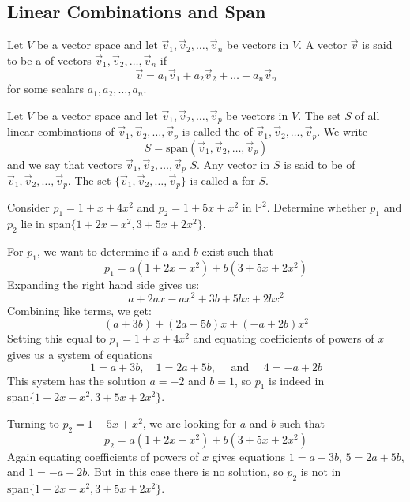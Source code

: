 \documentclass{ximera}
\begin{document}
\subsection*{Linear Combinations and Span}

\begin{definition}\label{def:lincombabstract}
Let $V$ be a vector space and let $\vec{v}_1, \vec{v}_2,\ldots ,\vec{v}_n$ be vectors in $V$.  A vector $\vec{v}$ is said to be a  of vectors $\vec{v}_1, \vec{v}_2,\ldots, \vec{v}_n$ if 
$$\vec{v}=a_1\vec{v}_1+ a_2\vec{v}_2+\ldots + a_n\vec{v}_n$$
for some scalars $a_1, a_2, \ldots ,a_n$.
\end{definition}

\begin{definition}\label{def:spanabstract} Let $V$ be a vector space and let $\vec{v}_1, \vec{v}_2,\ldots ,\vec{v}_p$ be vectors in $V$.  The set $S$ of all linear combinations of $\vec{v}_1, \vec{v}_2,\ldots ,\vec{v}_p$ is called the  of $\vec{v}_1, \vec{v}_2,\ldots ,\vec{v}_p$.  We write 
$$S=\mbox{span}(\vec{v}_1, \vec{v}_2,\ldots ,\vec{v}_p)$$
and we say that vectors $\vec{v}_1, \vec{v}_2,\ldots ,\vec{v}_p$  $S$.  Any vector in $S$ is said to be  of $\vec{v}_1, \vec{v}_2,\ldots ,\vec{v}_p$.  The set $\{\vec{v}_1, \vec{v}_2,\ldots ,\vec{v}_p\}$ is called a  for $S$.
\end{definition}

\begin{example}\label{ex:inthespanpoly}
Consider $p_{1} = 1 + x + 4x^{2}$ and $p_{2} = 1 + 5x + x^{2}$ in $\mathbb{P}^{2}$. Determine whether $p_{1}$ and $p_{2}$ lie in $\mbox{span}\{1 + 2x - x^{2}, 3 + 5x + 2x^{2}\}$.

\begin{explanation}
For $p_{1}$, we want to determine if $a$ and $b$ exist such that
\begin{equation*}
p_1 = a(1 + 2x - x^2) + b(3 + 5x + 2x^2)
\end{equation*}
Expanding the right hand side gives us:
$$a+2ax-ax^2+3b+5bx+2bx^2$$
Combining like terms, we get:
$$(a+3b)+(2a+5b)x+(-a+2b)x^2$$
Setting this equal to $p_{1} = 1 + x + 4x^{2}$ and
equating coefficients of powers of $x$ gives us a system of equations
\begin{equation*}
1 = a + 3b,\quad 1 = 2a + 5b, \quad \mbox{ and } \quad 4 = -a + 2b
\end{equation*}
This system has the solution $a = -2$ and $b = 1$, so $p_{1}$ is indeed in $\mbox{span}\{1 + 2x - x^{2}, 3 + 5x + 2x^{2}\}$.

Turning to $p_{2} = 1 + 5x + x^{2}$, we are looking for $a$ and $b$ such that 
\begin{equation*}
p_{2} = a(1 + 2x - x^{2}) + b(3 + 5x + 2x^{2})
\end{equation*}
 Again equating coefficients of powers of $x$ gives equations $1 = a + 3b$, $5 = 2a + 5b$, and $1 = -a + 2b$. But in this case there is no solution, so $p_{2}$ is not in $\mbox{span}\{1 + 2x - x^{2}, 3 + 5x + 2x^{2}\}$.
\end{explanation}
\end{example}
\end{document}
